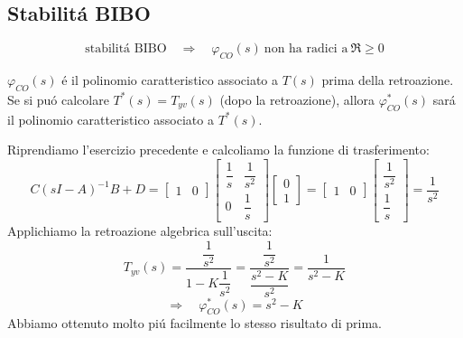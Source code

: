 \documentclass[../main.tex]{subfiles}
\begin{document}
	\subsection{Stabilit\'a BIBO}
		\[
			\text{stabilit\'a BIBO}\quad\Rightarrow\quad \varphi_{CO}(s)\ \text{non ha radici a}\ \Re \geq 0
		\]
		
		$ \varphi_{CO}(s) $ \'e il polinomio caratteristico associato a $ T(s) $ prima della retroazione. Se si pu\'o calcolare $ T^{*}(s) = T_{yv}(s) $ (dopo la retroazione), allora $ \varphi^{*}_{CO}(s) $ sar\'a il polinomio caratteristico associato a $ T^{*}(s) $.
		
		\begin{mdframed}[style=Exercise]
			\begin{Exercise}[title={Studio retr. alg. sull'uscita con l'algebra dei blocchi}]
				Riprendiamo l'esercizio precedente e calcoliamo la funzione di trasferimento:
				\[
					C(sI-A)^{-1}B +D =
					\begin{bmatrix}
						1 & 0
					\end{bmatrix}
					\begin{bmatrix}
						\dfrac{1}{s} & \dfrac{1}{s^2}
						\\[1em]
						0 & \dfrac{1}{s}
					\end{bmatrix}
					\begin{bmatrix}
						0\\
						1
					\end{bmatrix} =
					\begin{bmatrix}
						1 & 0
					\end{bmatrix}
					\begin{bmatrix}
						\dfrac{1}{s^2}
						\\[1em]
						\dfrac{1}{s}
					\end{bmatrix} =
					\dfrac{1}{s^2}
				\]
				Applichiamo la retroazione algebrica sull'uscita:
				\[
					T_{yv}(s) = \dfrac{\dfrac{1}{s^2}}{1-K\dfrac{1}{s^2}} = \dfrac{\dfrac{1}{s^2}}{\dfrac{s^2-K}{s^2}} = \dfrac{1}{s^2 - K}
				\]
				\[
					\Rightarrow\quad \varphi^{*}_{CO}(s) = s^2 -K
				\]
				Abbiamo ottenuto molto pi\'u facilmente lo stesso risultato di prima.
			\end{Exercise}
		\end{mdframed}
\end{document}
